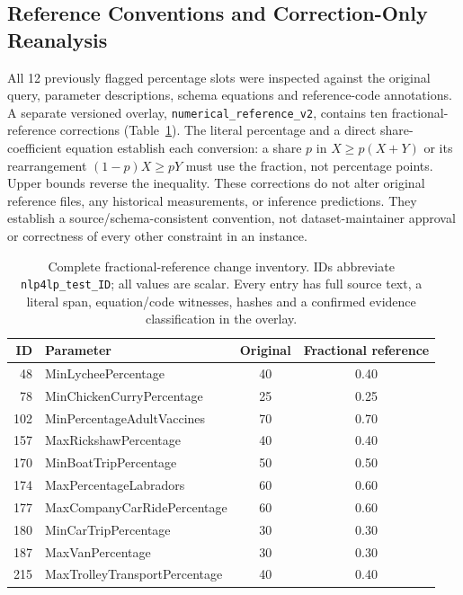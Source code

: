 \subsection{Reference Conventions and Correction-Only Reanalysis}
\label{app:reference-conventions}

All 12 previously flagged percentage slots were inspected against the
original query, parameter descriptions, schema equations and reference-code
annotations. A separate versioned overlay, \texttt{numerical\_reference\_v2},
contains ten fractional-reference corrections (Table~\ref{tab:reference-overlay}).
The literal percentage and a direct share-coefficient equation establish
each conversion: a share $p$ in $X\geq p(X+Y)$ or its rearrangement
$(1-p)X\geq pY$ must use the fraction, not percentage points. Upper bounds
reverse the inequality. These corrections do not alter original reference
files, any historical measurements, or inference predictions. They establish
a source/schema-consistent convention, not dataset-maintainer approval or
correctness of every other constraint in an instance.

\begin{table}[htbp]
\centering\small
\caption{Complete fractional-reference change inventory. IDs abbreviate
\texttt{nlp4lp\_test\_ID}; all values are scalar. Every entry has full source
text, a literal span, equation/code witnesses, hashes and a confirmed
evidence classification in the overlay.}
\label{tab:reference-overlay}
\begin{tabular}{@{}rlcc@{}}
\toprule
ID & Parameter & Original & Fractional reference\\
\midrule
48 & MinLycheePercentage & 40 & 0.40\\
78 & MinChickenCurryPercentage & 25 & 0.25\\
102 & MinPercentageAdultVaccines & 70 & 0.70\\
157 & MaxRickshawPercentage & 40 & 0.40\\
170 & MinBoatTripPercentage & 50 & 0.50\\
174 & MaxPercentageLabradors & 60 & 0.60\\
177 & MaxCompanyCarRidePercentage & 60 & 0.60\\
180 & MinCarTripPercentage & 30 & 0.30\\
187 & MaxVanPercentage & 30 & 0.30\\
215 & MaxTrolleyTransportPercentage & 40 & 0.40\\
\bottomrule
\end{tabular}
\end{table}

